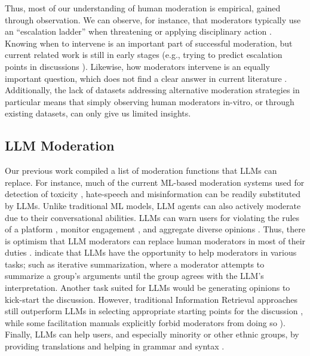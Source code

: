 Thus, most of our understanding of human moderation is empirical, gained through observation. We can observe, for instance, that moderators typically use an “escalation ladder” when threatening or applying disciplinary action \cite{seering_self_moderation}. Knowing when to intervene is an important part of successful moderation, but current related work 
is still in early stages (e.g., trying to predict escalation points in discussions \cite{korre2025evaluation}). Likewise, how moderators intervene is an equally important question, which does not find a clear answer in current literature \cite{korre2025evaluation}. Additionally, the lack of datasets addressing alternative moderation strategies in particular \cite{korre2025evaluation} means that simply observing human moderators in-vitro, or through existing datasets, can only give us limited insights.


\subsection{LLM Moderation}

Our previous work \cite{korre2025evaluation} compiled a list of moderation functions that \acp{LLM} can replace. For instance, much of the current \ac{ML}-based moderation systems used for detection of toxicity \cite{kang-qian-2024-implanting, Wang2022ToxicityDW}, hate-speech \cite{Nirmal2024TowardsIH, shi-2024-hatespeech} and misinformation \cite{Liu2024DetectIJ, Xu2024ACS} can be readily substituted by \acp{LLM}. Unlike traditional \ac{ML} models, \ac{LLM} agents can also actively moderate due to their conversational abilities. \acp{LLM} can warn users for violating the rules of a platform \cite{Kumar_AbuHashem_Durumeric_2024}, monitor engagement \cite{schroeder-etal-2024-fora}, and aggregate diverse opinions \cite{small-polis-llm}. Thus, there is optimism that \ac{LLM} moderators can replace human moderators in most of their duties \cite{small-polis-llm, seering_self_moderation}. \citet{small-polis-llm} indicate that \acp{LLM} have the opportunity to help moderators in various tasks; such as iterative summarization, where a moderator attempts to summarize a group's arguments until the group agrees with the \ac{LLM}'s interpretation. Another task suited for \acp{LLM} would be generating opinions to kick-start the discussion. However, traditional Information Retrieval approaches still outperform \acp{LLM} in selecting appropriate starting points for the discussion \cite{karadzhov2023delidata}, while some facilitation manuals explicitly forbid moderators from doing so \cite{dimitra-guide}). Finally, \acp{LLM} can help users, and especially minority or other ethnic groups, by providing translations and helping in grammar and syntax \cite{Tsai2024Generative}.

